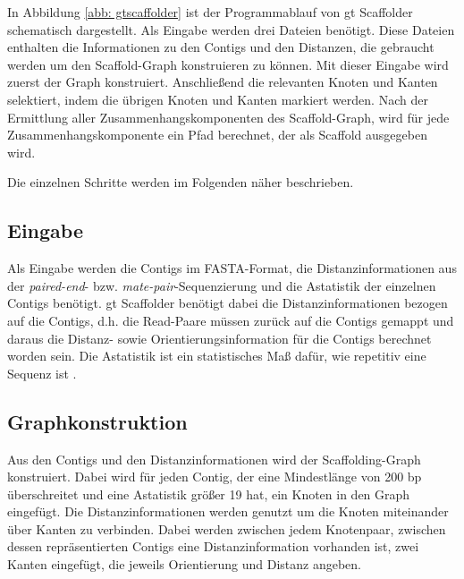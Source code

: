 \documentclass[a4paper,10pt,parskip]{scrartcl}
\begin{document}
In Abbildung \ref{abb: gtscaffolder} ist der Programmablauf von gt
Scaffolder schematisch dargestellt. Als Eingabe werden drei Dateien
benötigt. Diese Dateien enthalten die Informationen zu den Contigs und
den Distanzen, die gebraucht werden um den Scaffold-Graph konstruieren
zu können. Mit dieser Eingabe wird zuerst der Graph
konstruiert. Anschließend die relevanten Knoten und Kanten selektiert,
indem die übrigen Knoten und Kanten markiert werden. Nach der
Ermittlung aller Zusammenhangskomponenten des Scaffold-Graph, wird für
jede Zusammenhangskomponente ein Pfad berechnet, der als Scaffold
ausgegeben wird.

Die einzelnen Schritte werden im Folgenden näher
beschrieben.

\subsection{Eingabe}
Als Eingabe werden die Contigs im FASTA-Format, die
Distanzinformationen aus der \textit{paired-end}-
bzw. \textit{mate-pair}-Sequenzierung und die Astatistik der einzelnen
Contigs benötigt. gt Scaffolder benötigt dabei die
Distanzinformationen bezogen auf die Contigs, d.h. die Read-Paare
müssen zurück auf die Contigs gemappt und daraus die Distanz- sowie
Orientierungsinformation für die Contigs berechnet worden sein. Die
Astatistik ist ein statistisches Maß dafür, wie repetitiv eine Sequenz
ist \cite{Myers:2005iq}.

\subsection{Graphkonstruktion}
Aus den Contigs und den Distanzinformationen wird der
Scaffolding-Graph konstruiert. Dabei wird für jeden Contig, der eine
Mindestlänge von 200 bp überschreitet und eine Astatistik größer 19
hat, ein Knoten in den Graph eingefügt. Die Distanzinformationen
werden genutzt um die Knoten miteinander über Kanten zu
verbinden. Dabei werden zwischen jedem Knotenpaar, zwischen dessen
repräsentierten Contigs eine Distanzinformation vorhanden ist, zwei
Kanten eingefügt, die jeweils Orientierung und Distanz angeben.
\end{document}
